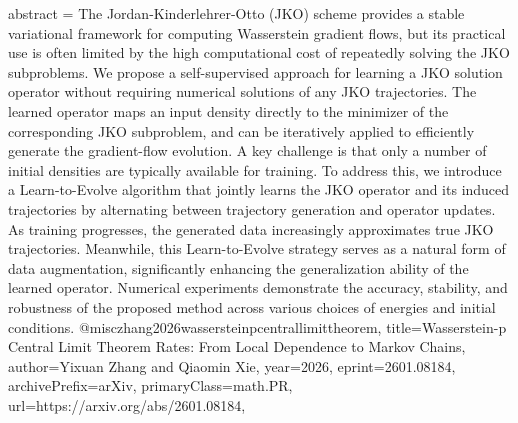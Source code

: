 {      abstract = {The Jordan-Kinderlehrer-Otto (JKO) scheme provides a stable variational framework for computing Wasserstein gradient flows, but its practical use is often limited by the high computational cost of repeatedly solving the JKO subproblems. We propose a self-supervised approach for learning a JKO solution operator without requiring numerical solutions of any JKO trajectories. The learned operator maps an input density directly to the minimizer of the corresponding JKO subproblem, and can be iteratively applied to efficiently generate the gradient-flow evolution. A key challenge is that only a number of initial densities are typically available for training. To address this, we introduce a Learn-to-Evolve algorithm that jointly learns the JKO operator and its induced trajectories by alternating between trajectory generation and operator updates. As training progresses, the generated data increasingly approximates true JKO trajectories. Meanwhile, this Learn-to-Evolve strategy serves as a natural form of data augmentation, significantly enhancing the generalization ability of the learned operator. Numerical experiments demonstrate the accuracy, stability, and robustness of the proposed method across various choices of energies and initial conditions.}
}@misc{zhang2026wassersteinpcentrallimittheorem,
      title={Wasserstein-p Central Limit Theorem Rates: From Local Dependence to Markov Chains}, 
      author={Yixuan Zhang and Qiaomin Xie},
      year={2026},
      eprint={2601.08184},
      archivePrefix={arXiv},
      primaryClass={math.PR},
      url={https://arxiv.org/abs/2601.08184},
}
